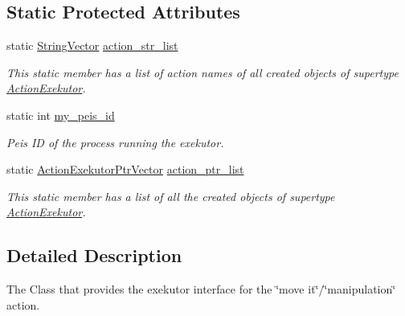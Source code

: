 \subsection*{\-Static \-Protected \-Attributes}
\begin{DoxyCompactItemize}
\item 
static \hyperlink{namespaceexekutor_a58d8a9cd227883a8eacb6400c9f62acb}{\-String\-Vector} \hyperlink{classexekutor_1_1ActionExekutor_a0dc39a7a2a3a67d2bdd366f9e6e682a2}{action\-\_\-str\-\_\-list}
\begin{DoxyCompactList}\small\item\em \-This static member has a list of action names of all created objects of supertype \hyperlink{classexekutor_1_1ActionExekutor}{\-Action\-Exekutor}. \end{DoxyCompactList}\item 
static int \hyperlink{classexekutor_1_1ActionExekutor_a31644a88e4d0166c2d3a70bab9eb5b99}{my\-\_\-peis\-\_\-id}
\begin{DoxyCompactList}\small\item\em \-Peis \-I\-D of the process running the exekutor. \end{DoxyCompactList}\item 
static \hyperlink{namespaceexekutor_a141a8f9a739e67ffb2356da18a653162}{\-Action\-Exekutor\-Ptr\-Vector} \hyperlink{classexekutor_1_1ActionExekutor_a73c4f2607b0725f5b201cf501cb42578}{action\-\_\-ptr\-\_\-list}
\begin{DoxyCompactList}\small\item\em \-This static member has a list of all the created objects of supertype \hyperlink{classexekutor_1_1ActionExekutor}{\-Action\-Exekutor}. \end{DoxyCompactList}\end{DoxyCompactItemize}


\subsection{\-Detailed \-Description}
\-The \-Class that provides the exekutor interface for the \char`\"{}move it\char`\"{}/\char`\"{}manipulation\char`\"{} action. 

